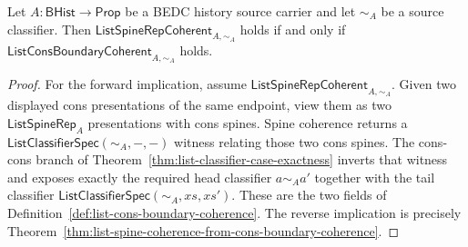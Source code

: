 \begin{theorem}
\label{thm:list-spine-coherence-iff-cons-boundary-coherence}
Let $A:\mathsf{BHist}\to\mathsf{Prop}$ be a BEDC history source carrier and let
$\sim_A$ be a source classifier. Then
$\mathsf{ListSpineRepCoherent}_{A,\sim_A}$ holds if and only if
$\mathsf{ListConsBoundaryCoherent}_{A,\sim_A}$ holds.
\end{theorem}
\begin{proof}
For the forward implication, assume
$\mathsf{ListSpineRepCoherent}_{A,\sim_A}$. Given two displayed cons
presentations of the same endpoint, view them as two
$\mathsf{ListSpineRep}_A$ presentations with cons spines. Spine coherence
returns a $\mathsf{ListClassifierSpec}(\sim_A,-,-)$ witness relating those two
cons spines. The cons-cons branch of
Theorem~\ref{thm:list-classifier-case-exactness} inverts that witness and
exposes exactly the required head classifier $a\sim_A a'$ together with the
tail classifier $\mathsf{ListClassifierSpec}(\sim_A,xs,xs')$. These are the two
fields of Definition~\ref{def:list-cons-boundary-coherence}. The reverse
implication is precisely
Theorem~\ref{thm:list-spine-coherence-from-cons-boundary-coherence}.
\end{proof}

